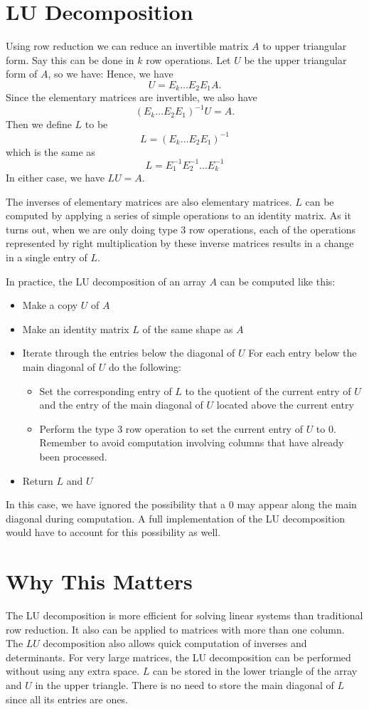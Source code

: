 \section*{LU Decomposition}
Using row reduction we can reduce an invertible matrix $A$ to upper triangular form.
Say this can be done in $k$ row operations.
Let $U$ be the upper triangular form of $A$, so we have:
Hence, we have
\[
U = E_k \dots E_2 E_1 A.
\]
Since the elementary matrices are invertible, we also have
\[
(E_k \dots E_2 E_1)^{-1} U =  A.
\]
Then we define $L$ to be
\[
L = (E_k \dots E_2 E_1)^{-1}
\]
which is the same as
\[
L = E_1^{-1} E_2^{-1} \dots E_k^{-1}
\]
In either case, we have $L U = A$.

The inverses of elementary matrices are also elementary matrices. $L$ can be computed by applying a series of simple operations to an identity matrix.
As it turns out, when we are only doing type 3 row operations, each of the operations represented by right multiplication by these inverse matrices results in a change in a single entry of $L$.

In practice, the LU decomposition of an array $A$ can be computed like this:
\begin{itemize}
\item Make a copy $U$ of $A$
\item Make an identity matrix $L$ of the same shape as $A$
\item Iterate through the entries below the diagonal of $U$
For each entry below the main diagonal of $U$ do the following:
	\begin{itemize}
	\item Set the corresponding entry of $L$ to the quotient of the current entry of $U$ and the entry of the main diagonal of $U$ located above the current entry
	\item Perform the type 3 row operation to set the current entry of $U$ to 0.
		Remember to avoid computation involving columns that have already been processed.
	\end{itemize}
\item Return $L$ and $U$
\end{itemize}
In this case, we have ignored the possibility that a 0 may appear along the main diagonal during computation.
A full implementation of the LU decomposition would have to account for this possibility as well.

\section*{Why This Matters}
The LU decomposition is more efficient for solving linear systems than traditional row reduction.
It also can be applied to matrices with more than one column.
The $LU$ decomposition also allows quick computation of inverses and determinants.
For very large matrices, the LU decomposition can be performed without using any extra space.
$L$ can be stored in the lower triangle of the array and $U$ in the upper triangle.
There is no need to store the main diagonal of $L$ since all its entries are ones.

